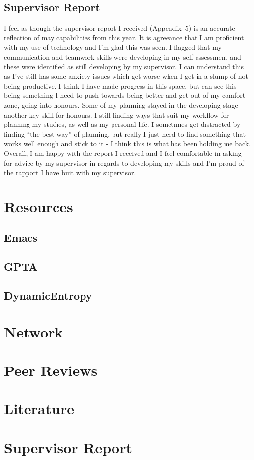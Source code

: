 \documentclass[11pt]{article}
\begin{document}
\subsection{Supervisor Report}

I feel as though the supervisor report I received (Appendix~\ref{appendix:suprep}) is an accurate reflection of may capabilities from this year. It is agreeance that I am proficient with my use of technology and I'm glad this was seen. I flagged that my communication and teamwork skills were developing in my self assessment and these were identified as still developing by my supervisor. I can understand this as I've still has some anxiety issues which get worse when I get in a slump of not being productive. I think I have made progress in this space, but can see this being something I need to push towards being better and get out of my comfort zone, going into honours. Some of my planning stayed in the developing stage - another key skill for honours. I still finding ways that suit my workflow for planning my studies, as well as my personal life. I sometimes get distracted by finding ``the best way'' of planning, but really I just need to find something that works well enough and stick to it - I think this is what has been holding me back. Overall, I am happy with the report I received and I feel comfortable in asking for advice by my supervisor in regards to developing my skills and I'm proud of the rapport I have buit with my supervisor.

\section{Resources}

\subsection{Emacs}
\subsection{GPTA}
\subsection{DynamicEntropy}

\section{Network}

\section{Peer Reviews}

\section{Literature}




\appendix

\section{Supervisor Report}
\label{appendix:suprep}


\end{document}
